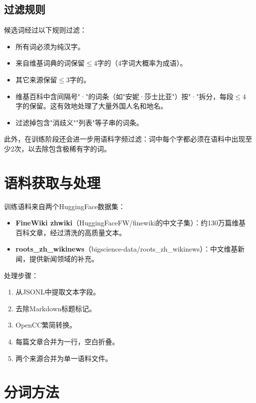 \documentclass[11pt,a4paper]{article}
\begin{document}
\subsection{过滤规则}

候选词经过以下规则过滤：

\begin{itemize}
    \item 所有词必须为纯汉字。
    \item 来自维基词典的词保留$\leq 4$字的（4字词大概率为成语）。
    \item 其它来源保留$\leq 3$字的。
    \item 维基百科中含间隔号"·"的词条（如"安妮·莎士比亚"）按"·"拆分，每段$\leq 4$字的保留。这有效地处理了大量外国人名和地名。
    \item 过滤掉包含"消歧义""列表"等子串的词条。
\end{itemize}

此外，在训练阶段还会进一步用语料字频过滤：词中每个字都必须在语料中出现至少2次，以去除包含极稀有字的词。

\section{语料获取与处理}

训练语料来自两个HuggingFace数据集：

\begin{itemize}
    \item \textbf{FineWiki zhwiki}（HuggingFaceFW/finewiki的中文子集）：约130万篇维基百科文章，经过清洗的高质量文本。
    \item \textbf{roots\_zh\_wikinews}（bigscience-data/roots\_zh\_wikinews）：中文维基新闻，提供新闻领域的补充。
\end{itemize}

处理步骤：
\begin{enumerate}
    \item 从JSONL中提取文本字段。
    \item 去除Markdown标题标记。
    \item OpenCC繁简转换。
    \item 每篇文章合并为一行，空白折叠。
    \item 两个来源合并为单一语料文件。
\end{enumerate}

\section{分词方法}
\end{document}
